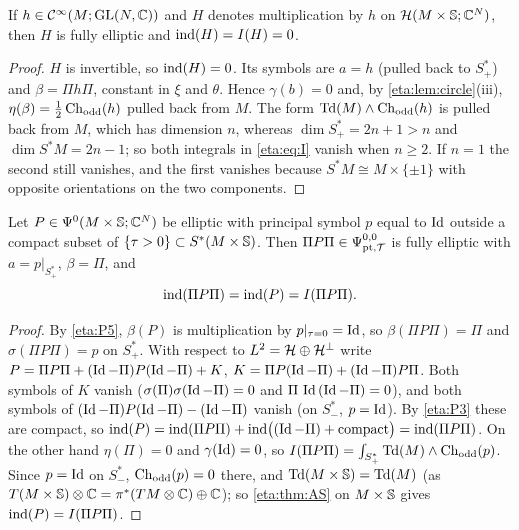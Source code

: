 \begin{lemma}\label{eta:lem:base-multiplication}
If $h\in\mathcal{C}^\infty(M;\operatorname{GL}(N,\mathbb{C}))$ and $H$ denotes multiplication by $h$ on
$\mathcal{H}(M\times\mathbb{S};\mathbb{C}^N)$, then $H$ is fully elliptic and $\operatorname{ind}(H)=I(H)=0$.
\end{lemma}

\begin{proof} $H$ is invertible, so $\operatorname{ind}(H)=0$. Its symbols are $a=h$ (pulled back to
$S^*_+$) and $\beta=\Pi h\Pi$, constant in $\xi$ and $\theta$. Hence $\gamma(b)=0$ and, by
\cref{eta:lem:circle}(iii), $\eta(\beta)=\frac12\operatorname{Ch}_{\mathrm{odd}}(h)$ pulled back from $M$. The form
$\operatorname{Td}(M)\wedge\operatorname{Ch}_{\mathrm{odd}}(h)$ is pulled back from $M$, which has dimension $n$, whereas
$\dim S^*_+=2n+1>n$ and $\dim S^*M=2n-1$; so both integrals in \eqref{eta:eq:I} vanish
when $n\ge2$. If $n=1$ the second still vanishes, and the first vanishes because
$S^*M\cong M\times\{\pm1\}$ with opposite orientations on the two components.
\end{proof}

\begin{lemma}\label{eta:lem:compression}
Let $P\in\Psi^{0}(M\times\mathbb{S};\mathbb{C}^N)$ be elliptic with principal symbol $p$ equal to
$\operatorname{Id}$ outside a compact subset of $\{\tau>0\}\subset S^*(M\times\mathbb{S})$. Then
$\Pi P\Pi\in\Psi^{0,0}_{\mathrm{pt},\mathcal{T}}$ is fully elliptic with $a=p|_{S^*_+}$, $\beta=\Pi$, and
\[
\operatorname{ind}(\Pi P\Pi)=\operatorname{ind}(P)=I(\Pi P\Pi).
\]
\end{lemma}

\begin{proof} By \ref{eta:P5}, $\beta(P)$ is multiplication by $p|_{\tau=0}=\operatorname{Id}$, so
$\beta(\Pi P\Pi)=\Pi$ and $\sigma(\Pi P\Pi)=p$ on $S^*_+$. With respect to
$L^2=\mathcal{H}\oplus\mathcal{H}^\perp$ write $P=\Pi P\Pi+(\operatorname{Id}-\Pi)P(\operatorname{Id}-\Pi)+K$,
$K=\Pi P(\operatorname{Id}-\Pi)+(\operatorname{Id}-\Pi)P\Pi$. Both symbols of $K$ vanish ($\sigma(\Pi)\sigma(\operatorname{Id}-\Pi)=0$
and $\Pi\,\operatorname{Id}\,(\operatorname{Id}-\Pi)=0$), and both symbols of $(\operatorname{Id}-\Pi)P(\operatorname{Id}-\Pi)-(\operatorname{Id}-\Pi)$ vanish
(on $S^*_-$, $p=\operatorname{Id}$). By \ref{eta:P3} these are compact, so $\operatorname{ind}(P)=\operatorname{ind}(\Pi P\Pi)
+\operatorname{ind}\bigl((\operatorname{Id}-\Pi)+\text{compact}\bigr)=\operatorname{ind}(\Pi P\Pi)$. On the other hand
$\eta(\Pi)=0$ and $\gamma(\operatorname{Id})=0$, so $I(\Pi P\Pi)=\int_{S^*_+}\operatorname{Td}(M)\wedge\operatorname{Ch}_{\mathrm{odd}}(p)$.
Since $p=\operatorname{Id}$ on $S^*_-$, $\operatorname{Ch}_{\mathrm{odd}}(p)=0$ there, and $\operatorname{Td}(M\times\mathbb{S})=\operatorname{Td}(M)$ (as
$T(M\times\mathbb{S})\otimes\mathbb{C}=\pi^*(TM\otimes\mathbb{C})\oplus\mathbb{C}$); so \cref{eta:thm:AS} on
$M\times\mathbb{S}$ gives $\operatorname{ind}(P)=I(\Pi P\Pi)$.
\end{proof}

